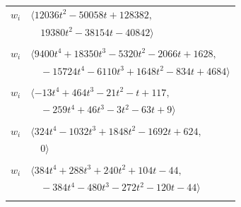 \documentclass[11pt]{article}
\begin{document}
\begin{longtable}{@{}ll@{}}
$w_i$ & $\langle 12036t^{2}-50058t+128382,$\\
 & $\quad 19380t^{2}-38154t-40842\rangle$\\
\addlinespace[2pt]
\multicolumn{2}{@{}p{0.97\textwidth}@{}}{$i=64$, $D_i=1$, $\rho_{ij}$: $2{:}2, \allowbreak 3{:}3, \allowbreak 7{:}1, \allowbreak 10{:}2, \allowbreak 14{:}3, \allowbreak 20{:}2, \allowbreak 25{:}1, \allowbreak 30{:}1, \allowbreak 31{:}1, \allowbreak 32{:}3, \allowbreak 38{:}2, \allowbreak 45{:}1, \allowbreak 46{:}1, \allowbreak 49{:}3, \allowbreak 51{:}2, \allowbreak 61{:}3, \allowbreak 72{:}3, \allowbreak 77{:}2$}\\
$w_i$ & $\langle 9400t^{4}+18350t^{3}-5320t^{2}-2066t+1628,$\\
 & $\quad -15724t^{4}-6110t^{3}+1648t^{2}-834t+4684\rangle$\\
\addlinespace[2pt]
\multicolumn{2}{@{}p{0.97\textwidth}@{}}{$i=65$, $D_i=1$, $\rho_{ij}$: $7{:}1, \allowbreak 8{:}1, \allowbreak 14{:}2, \allowbreak 24{:}1, \allowbreak 26{:}3, \allowbreak 34{:}3, \allowbreak 37{:}3, \allowbreak 55{:}1, \allowbreak 59{:}1, \allowbreak 63{:}2, \allowbreak 69{:}2, \allowbreak 74{:}1, \allowbreak 75{:}2, \allowbreak 76{:}3$}\\
$w_i$ & $\langle -13t^{4}+464t^{3}-21t^{2}-t+117,$\\
 & $\quad -259t^{4}+46t^{3}-3t^{2}-63t+9\rangle$\\
\addlinespace[2pt]
\multicolumn{2}{@{}p{0.97\textwidth}@{}}{$i=66$, $D_i=1$, $\rho_{ij}$: $32{:}1, \allowbreak 33{:}3, \allowbreak 34{:}3, \allowbreak 37{:}1, \allowbreak 40{:}3, \allowbreak 54{:}3, \allowbreak 56{:}3, \allowbreak 59{:}2$}\\
$w_i$ & $\langle 324t^{4}-1032t^{3}+1848t^{2}-1692t+624,$\\
 & $\quad 0\rangle$\\
\addlinespace[2pt]
\multicolumn{2}{@{}p{0.97\textwidth}@{}}{$i=67$, $D_i=1$, $e_i=0$, $\rho_{ij}$: $1{:}3, \allowbreak 9{:}2, \allowbreak 27{:}3, \allowbreak 30{:}3, \allowbreak 32{:}1, \allowbreak 33{:}3, \allowbreak 44{:}2, \allowbreak 62{:}2$}\\
$w_i$ & $\langle 384t^{4}+288t^{3}+240t^{2}+104t-44,$\\
 & $\quad -384t^{4}-480t^{3}-272t^{2}-120t-44\rangle$\\
\addlinespace[2pt]
\multicolumn{2}{@{}p{0.97\textwidth}@{}}{$i=68$, $D_i=2$, $\rho_{ij}$: $0{:}3, \allowbreak 12{:}1, \allowbreak 14{:}1, \allowbreak 20{:}2, \allowbreak 21{:}3, \allowbreak 25{:}3, \allowbreak 27{:}2, \allowbreak 28{:}1, \allowbreak 42{:}1, \allowbreak 57{:}1, \allowbreak 62{:}1, \allowbreak 69{:}2, \allowbreak 70{:}1, \allowbreak 74{:}2$}\\

\end{longtable}
\end{document}
